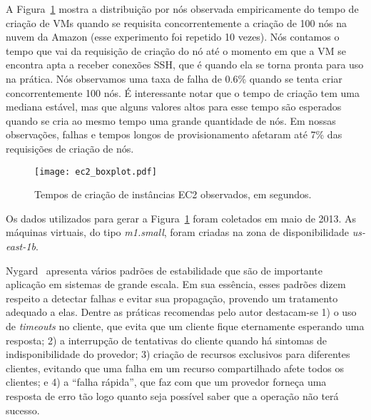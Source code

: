 \begin{description}
A Figura~\ref{fig:ec2_boxplot} mostra a distribuição por nós observada empiricamente
do tempo de criação de VMs quando se requisita concorrentemente a criação
de 100 nós na nuvem da Amazon (esse experimento foi repetido 10 vezes).
Nós contamos o tempo que vai da requisição de criação do nó
até o momento em que a VM se encontra apta a receber conexões SSH,
que é quando ela se torna pronta para uso na prática.
Nós observamos uma taxa de falha de 0.6\%
quando se tenta criar concorrentemente 100 nós.
É interessante notar que o tempo de criação tem uma mediana estável,
mas que alguns valores altos para esse tempo são esperados quando
se cria ao mesmo tempo uma grande quantidade de nós.
Em nossas observações, falhas e tempos longos de provisionamento
afetaram até 7\% das requisições de criação de nós.

\begin{figure}[ht]
\centering
\texttt{[image: ec2\_boxplot.pdf]}
\caption{Tempos de criação de instâncias EC2 observados, em segundos.}
\label{fig:ec2_boxplot}
\end{figure}

Os dados utilizados para gerar a Figura~\ref{fig:ec2_boxplot}
foram coletados em maio de 2013. As máquinas virtuais, 
do tipo \emph{m1.small}, foram criadas na zona de disponibilidade \emph{us-east-1b}.

Nygard~\cite{Nygard2009Release} apresenta vários padrões de estabilidade que são de importante aplicação em sistemas de grande escala. Em sua essência, esses padrões dizem respeito a detectar falhas e evitar sua propagação, provendo um tratamento adequado a elas. Dentre as práticas recomendas pelo autor destacam-se 1) o uso de \emph{timeouts} no cliente, que evita que um cliente fique eternamente esperando uma resposta; 2) a interrupção de tentativas do cliente quando há sintomas de indisponibilidade do provedor; 3) criação de recursos exclusivos para diferentes clientes, evitando que uma falha em um recurso compartilhado afete todos os clientes; e 4) a ``falha rápida'', que faz com que um provedor forneça uma resposta de erro tão logo quanto seja possível saber que a operação não terá sucesso. 


\end{description}
